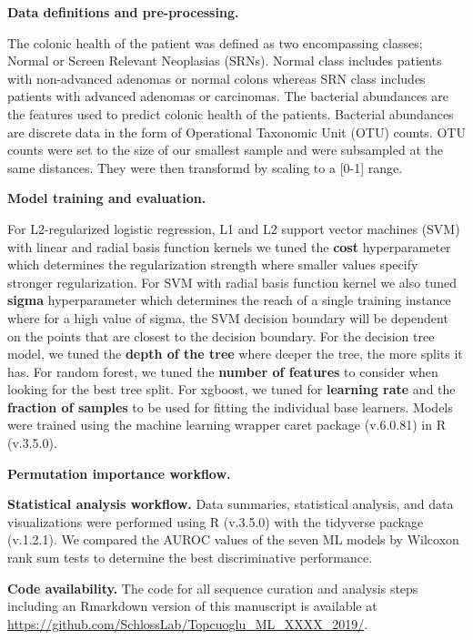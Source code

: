 \documentclass[11pt,]{article}
\begin{document}
\textbf{Data definitions and pre-processing.}

The colonic health of the patient was defined as two encompassing
classes; Normal or Screen Relevant Neoplasias (SRNs). Normal class
includes patients with non-advanced adenomas or normal colons whereas
SRN class includes patients with advanced adenomas or carcinomas. The
bacterial abundances are the features used to predict colonic health of
the patients. Bacterial abundances are discrete data in the form of
Operational Taxonomic Unit (OTU) counts. OTU counts were set to the size
of our smallest sample and were subsampled at the same distances. They
were then transformd by scaling to a {[}0-1{]} range.

\textbf{Model training and evaluation.}

For L2-regularized logistic regression, L1 and L2 support vector
machines (SVM) with linear and radial basis function kernels we tuned
the \textbf{cost} hyperparameter which determines the regularization
strength where smaller values specify stronger regularization. For SVM
with radial basis function kernel we also tuned \textbf{sigma}
hyperparameter which determines the reach of a single training instance
where for a high value of sigma, the SVM decision boundary will be
dependent on the points that are closest to the decision boundary. For
the decision tree model, we tuned the \textbf{depth of the tree} where
deeper the tree, the more splits it has. For random forest, we tuned the
\textbf{number of features} to consider when looking for the best tree
split. For xgboost, we tuned for \textbf{learning rate} and the
\textbf{fraction of samples} to be used for fitting the individual base
learners. Models were trained using the machine learning wrapper caret
package (v.6.0.81) in R (v.3.5.0).

\textbf{Permutation importance workflow.}

\textbf{Statistical analysis workflow.} Data summaries, statistical
analysis, and data visualizations were performed using R (v.3.5.0) with
the tidyverse package (v.1.2.1). We compared the AUROC values of the
seven ML models by Wilcoxon rank sum tests to determine the best
discriminative performance.

\textbf{Code availability.} The code for all sequence curation and
analysis steps including an Rmarkdown version of this manuscript is
available at
\url{https://github.com/SchlossLab/Topcuoglu_ML_XXXX_2019/}.

\newpage
\end{document}
